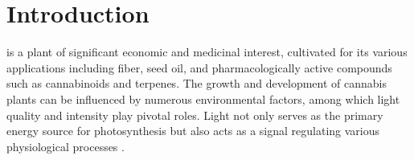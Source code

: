 \section{Introduction}

 is a plant of significant economic and medicinal interest, cultivated for its various applications including fiber, seed oil, and pharmacologically active compounds such as cannabinoids and terpenes. The growth and development of cannabis plants can be influenced by numerous environmental factors, among which light quality and intensity play pivotal roles. Light not only serves as the primary energy source for photosynthesis but also acts as a signal regulating various physiological processes \autocite{eichhorn_bilodeau_update_2019}.
